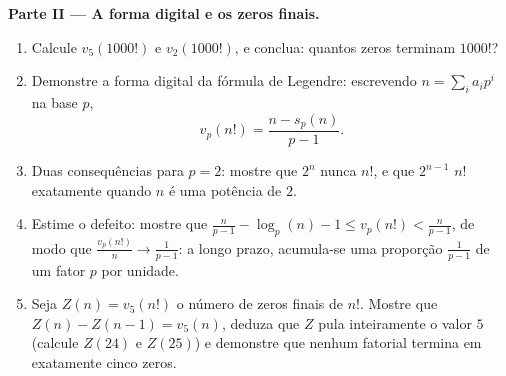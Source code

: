 \begin{problem}
\medskip
\noindent\textbf{Parte II --- A forma digital e os zeros
finais.}
\begin{enumerate}
  \item Calcule $v_5(1000!)$ e $v_2(1000!)$, e conclua: quantos
        zeros terminam $1000!$?
  \item Demonstre a forma digital da fórmula de Legendre: escrevendo
        $n =
        \sum_i a_i p^i$ na base $p$,
        \[
        v_p(n!) = \frac{n - s_p(n)}{p - 1} .
        \]
  \item Duas consequências para $p = 2$: mostre que $2^n$ nunca
         $n!$, e que $2^{n-1}$  $n!$ exatamente quando
        $n$ é uma potência de $2$.
  \item Estime o defeito: mostre que $\frac n{p-1} - \log_p(n) - 1 \leq
        v_p(n!) < \frac n{p-1}$, de modo que $\frac{v_p(n!)}{n} \to
        \frac1{p-1}$: a longo prazo, acumula-se uma proporção
        $\frac1{p-1}$ de um fator $p$ por unidade.
  \item Seja $Z(n) = v_5(n!)$ o número de zeros finais de
        $n!$. Mostre que $Z(n) - Z(n-1) = v_5(n)$, deduza que $Z$ pula
        inteiramente o valor $5$ (calcule $Z(24)$ e $Z(25)$) e
        demonstre que nenhum fatorial termina em exatamente cinco zeros.
\end{enumerate}


\end{problem}
